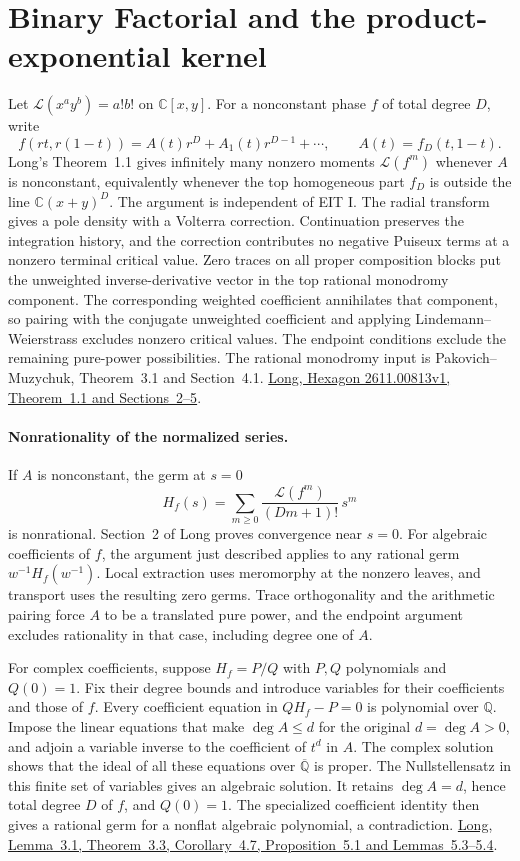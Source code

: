 \documentclass[11pt]{article}
\newcommand{\Lfac}{\mathcal L}
\newcommand{\C}{\mathbb C}
\newcommand{\Q}{\mathbb Q}
\begin{document}
\section*{Binary Factorial and the product-exponential kernel}
Let $\Lfac(x^ay^b)=a!b!$ on $\C[x,y]$. For a nonconstant phase $f$ of
total degree $D$, write
\[
 f(rt,r(1-t))=A(t)r^D+A_1(t)r^{D-1}+\cdots,
 \qquad A(t)=f_D(t,1-t).
\]
Long's Theorem~1.1 gives infinitely many nonzero moments $\Lfac(f^m)$
whenever $A$ is nonconstant, equivalently whenever the top homogeneous
part $f_D$ is outside the line $\C(x+y)^D$. The argument is independent
of EIT I. The radial transform gives a pole density with a Volterra
correction. Continuation preserves the integration history, and the
correction contributes no negative Puiseux terms at a nonzero terminal
critical value. Zero traces on all proper composition blocks put the
unweighted inverse-derivative vector in the top rational monodromy
component. The corresponding weighted coefficient annihilates that
component, so pairing with the conjugate unweighted coefficient and
applying Lindemann--Weierstrass excludes nonzero critical values. The
endpoint conditions exclude the remaining pure-power possibilities.
The rational monodromy input is Pakovich--Muzychuk, Theorem~3.1 and
Section~4.1. \href{https://hexagonmath.org/2611.00813v1}{Long, Hexagon
2611.00813v1, Theorem~1.1 and Sections~2--5}.

\paragraph{Nonrationality of the normalized series.}
If $A$ is nonconstant, the germ at $s=0$
\[
 H_f(s)=\sum_{m\geq0}\frac{\Lfac(f^m)}{(Dm+1)!}\,s^m
\]
is nonrational. Section~2 of Long proves convergence near $s=0$. For
algebraic coefficients of $f$, the argument just described applies to
any rational germ $w^{-1}H_f(w^{-1})$. Local extraction uses meromorphy
at the nonzero leaves, and transport uses the resulting zero germs.
Trace orthogonality and the arithmetic pairing force $A$ to be a
translated pure power, and the endpoint argument excludes rationality in
that case, including degree one of $A$.

For complex coefficients, suppose $H_f=P/Q$ with $P,Q$ polynomials
and $Q(0)=1$. Fix their degree bounds and introduce variables for their
coefficients and those of $f$. Every coefficient equation in
$QH_f-P=0$ is polynomial over $\Q$. Impose the linear equations that
make $\deg A\leq d$ for the original $d=\deg A>0$, and adjoin a variable
inverse to the coefficient of $t^d$ in $A$. The complex solution shows
that the ideal of all these equations over $\overline{\Q}$ is proper.
The Nullstellensatz in this finite set of variables gives an algebraic
solution. It retains $\deg A=d$, hence total degree $D$ of $f$, and
$Q(0)=1$. The specialized coefficient identity then gives a rational
germ for a nonflat algebraic polynomial, a contradiction.
\href{https://hexagonmath.org/2611.00813v1}{Long, Lemma~3.1,
Theorem~3.3, Corollary~4.7, Proposition~5.1 and Lemmas~5.3--5.4}.
\end{document}
